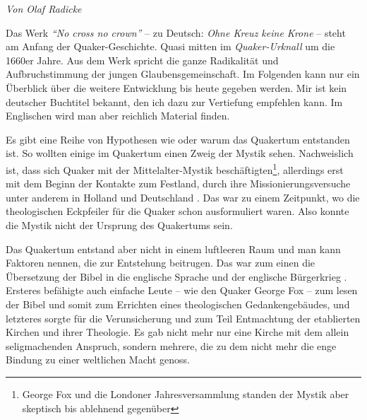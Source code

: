 


\begin{flushright}
\begin{footnotesize}
\textit{Von Olaf Radicke}
\end{footnotesize}
\end{flushright}
\smallskip

Das Werk \textit{"`No cross no crown"'} -- zu Deutsch: \textit{Ohne Kreuz keine
Krone} --
steht am Anfang der Quaker-Geschichte. Quasi mitten im
\textit{Quaker-Urknall}
um die 1660er Jahre. Aus dem Werk spricht die ganze Radikalität und
Aufbruchstimmung der jungen Glaubensgemeinschaft. Im Folgenden kann nur ein
Überblick über die weitere Entwicklung bis heute gegeben werden. Mir ist kein
deutscher Buchtitel bekannt, den ich dazu zur Vertiefung empfehlen kann. Im
Englischen wird man aber reichlich Material finden.

\medskip

Es gibt eine Reihe von Hypothesen wie oder warum das Quakertum
entstanden ist.
So
wollten einige im Quakertum einen Zweig der Mystik  sehen.
Nachweislich ist, dass
sich Quaker mit der Mittelalter-Mystik beschäftigten\footnote{George Fox und die
Londoner Jahresversammlung standen der Mystik aber skeptisch bis ablehnend
gegenüber}, allerdings erst mit dem
Beginn der Kontakte zum Festland, durch ihre Missionierungsversuche
 unter
anderem in Holland  und Deutschland
. Das war zu einem Zeitpunkt, wo die
theologischen Eckpfeiler für die Quaker schon ausformuliert waren. Also konnte
die Mystik nicht der Ursprung des Quakertums sein.

\medskip

Das Quakertum entstand aber nicht in einem luftleeren Raum und man kann Faktoren
nennen,
die zur Entstehung beitrugen. Das war zum einen die Übersetzung der Bibel
in die englische Sprache und der englische Bürgerkrieg
. Ersteres befähigte auch
einfache Leute -- wie den Quaker George Fox  -- zum
lesen der Bibel und somit zum
Errichten eines theologischen Gedankengebäudes, und letzteres sorgte für die
Verunsicherung und zum Teil Entmachtung der etablierten Kirchen
 und ihrer
Theologie. Es gab nicht mehr nur eine Kirche mit dem allein seligmachenden
Anspruch, sondern mehrere, die zu dem nicht mehr die enge Bindung zu einer
weltlichen Macht genoss.

